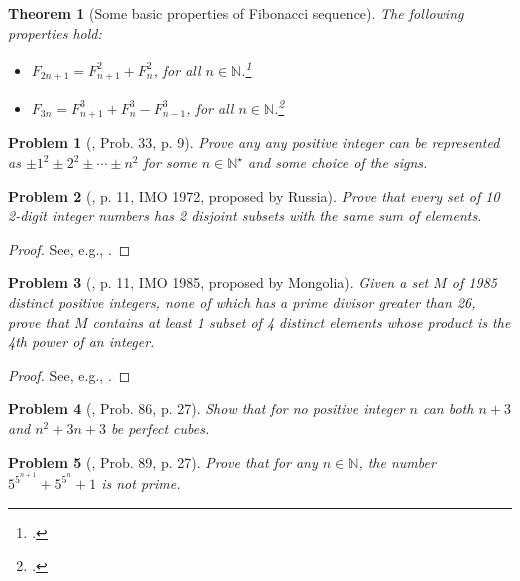 \documentclass[oneside]{book}
\numberwithin{equation}{section}
\newtheorem{problem}{Problem}[section]
\newtheorem{theorem}{Theorem}[section]
\begin{document}
\begin{theorem}[Some basic properties of Fibonacci sequence]
	The following properties hold:
	\begin{itemize}
		\item $F_{2n+1} = F_{n+1}^2 + F_n^2$, for all $n\in\mathbb{N}$.\footnote{\cite[Prob. 27, p. 9]{Gelca_Andreescu2017}.}
		\item $F_{3n} = F_{n+1}^3 + F_n^3 - F_{n-1}^3$, for all $n\in\mathbb{N}$.\footnote{\cite[Prob. 28, p. 9]{Gelca_Andreescu2017}.}
	\end{itemize}
\end{theorem}

\begin{problem}[\cite{Gelca_Andreescu2017}, Prob. 33, p. 9]
	Prove any any positive integer can be represented as $\pm1^2\pm2^2\pm\cdots\pm n^2$ for some $n\in\mathbb{N}^\star$ and some choice of the signs.
\end{problem}

\begin{problem}[\cite{Gelca_Andreescu2017}, p. 11, IMO 1972, proposed by Russia]
	Prove that every set of 10 2-digit integer numbers has 2 disjoint subsets with the same sum of elements.
\end{problem}

\begin{proof}[Proof]
	See, e.g., \cite[p. 11]{Gelca_Andreescu2017}.
\end{proof}

\begin{problem}[\cite{Gelca_Andreescu2017}, p. 11, IMO 1985, proposed by Mongolia]
	Given a set $M$ of 1985 distinct positive integers, none of which has a prime divisor greater than 26, prove that $M$ contains at least 1 subset of 4 distinct elements whose product is the 4th power of an integer.
\end{problem}

\begin{proof}[Proof]
	See, e.g., \cite[pp. 11--12]{Gelca_Andreescu2017}.
\end{proof}

\begin{problem}[\cite{Gelca_Andreescu2017}, Prob. 86, p. 27]
	Show that for no positive integer $n$ can both $n + 3$ and $n^2 + 3n + 3$ be perfect cubes.
\end{problem}

\begin{problem}[\cite{Gelca_Andreescu2017}, Prob. 89, p. 27]
	Prove that for any $n\in\mathbb{N}$, the number $5^{5^{n+1}} + 5^{5^n} + 1$ is not prime.
\end{problem}
\end{document}
